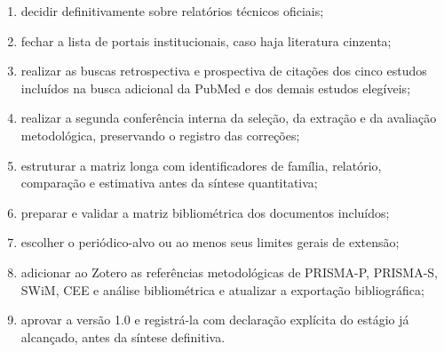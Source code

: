 \documentclass[11pt,a4paper]{article}
\begin{document}
\begin{enumerate}
  \item decidir definitivamente sobre relatórios técnicos oficiais;
  \item fechar a lista de portais institucionais, caso haja literatura cinzenta;
  \item realizar as buscas retrospectiva e prospectiva de citações dos cinco
  estudos incluídos na busca adicional da PubMed e dos demais estudos elegíveis;
  \item realizar a segunda conferência interna da seleção, da extração e da avaliação
  metodológica, preservando o registro das correções;
  \item estruturar a matriz longa com identificadores de família, relatório,
  comparação e estimativa antes da síntese quantitativa;
  \item preparar e validar a matriz bibliométrica dos documentos incluídos;
  \item escolher o periódico-alvo ou ao menos seus limites gerais de extensão;
  \item adicionar ao Zotero as referências metodológicas de PRISMA-P, PRISMA-S,
  SWiM, CEE e análise bibliométrica e atualizar a exportação bibliográfica;
  \item aprovar a versão 1.0 e registrá-la com declaração explícita do estágio já
  alcançado, antes da síntese definitiva.
\end{enumerate}

\printbibliography[title={Referências disponíveis na biblioteca do projeto}]
\end{document}
